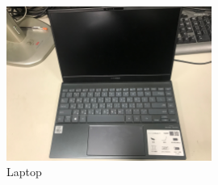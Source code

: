 \documentclass[12pt, a4paper, onside]{article}
\begin{document}
\begin{figure}[h]
  \centering
  \includegraphics[width=0.6\textwidth]{img/9_pic_laptop}
  \caption{Laptop}
\end{figure}

\clearpage
\end{document}

